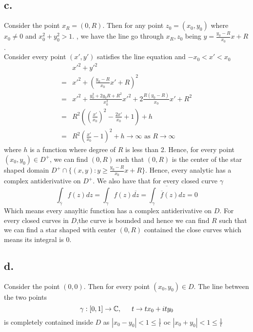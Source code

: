 \documentclass[11pt]{article}
\begin{document}
\subsection*{c.}
Consider the point $x_R = (0,R)$. 
Then for any point $z_0 = (x_0, y_0)$ where $x_0 \ne 0$ and $x_0^2 + y_0^2 > 1$. , we have the line go through $x_R, z_0$ being $y = \frac{y_0 - R}{x_0}x + R$. \\
Consider every point $(x',y')$ satisfies the line equation and
$-x_0 < x' < x_0$
\begin{equation*}
    \begin{aligned}
        & x'^2+y'^2 \\
        =& x'^2 + \left( \frac{y_0 - R}{x_0}x' + R \right)^2 \\
        =& x'^2 + \frac{y_0^2 + 2y_0R + R^2}{x_0^2}x'^2 + 2\frac{R(y_0-R)}{x_0}x' + R^2 \\
        =& R^2 \left( \left( \frac{x'}{x_0} \right)^2 - \frac{2x'}{x_0} + 1 \right) + h \\
        =& R^2 \left( \frac{x'}{x_0} - 1\right)^2 + h \to \infty \text{ as } R \to \infty
    \end{aligned}
\end{equation*}
where $h$ is a function where degree of $R$ is less than 2. Hence, for every point $(x_0,y_0) \in D^+$, we can find $(0,R)$ such that $(0,R)$ is the center of the 
star shaped domain
$D^+ \cap \{(x,y): y \ge \frac{y_0 - R}{x_0}x + R \}$.  Hence, every analytic has a complex antiderivative on $D^+$.
We also have that for every closed curve $\gamma$
\[
    \int_{\overline{\gamma}} f(z) dz = \int_\gamma f(z) \overline{dz} = \overline{\int_\gamma \overline{f}(z) dz} = 0
\]
Which means every anayltic function has a complex antiderivative on $D$. 
For every closed curves in $D$,the curve is bounded and hence we can find $R$ such that 
we can find a star shaped with center $(0,R)$ contained the close curves which means its integral is 0.
\subsection*{d.}
Consider the point $(0,0)$. Then for every point $(x_0,y_0) \in D$. The line between the two points
\[
    \gamma: [0,1] \to \mathbb{C}, \indent t \to tx_0 + ity_0
\]
is completely contained inside $D$ as $|x_0 - y_0| < 1 \le \frac{1}{t}$ oc  $|x_0 + y_0| < 1 \le \frac{1}{t}$
\newpage
\end{document}
